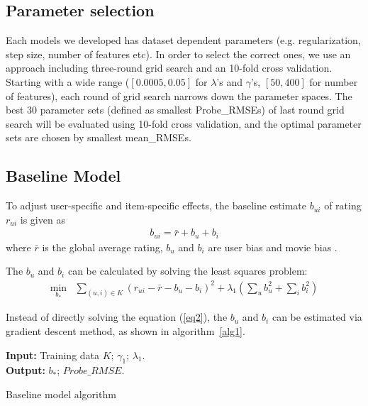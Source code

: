 \documentclass[journal]{IEEEtran}
\begin{document}
\subsection{Parameter selection}
Each models we developed has dataset dependent parameters (e.g. regularization, step size, number of features etc). In order to select the correct ones, we use an approach including three-round grid search and an 10-fold cross validation.  Starting with a wide range ($[0.0005, 0.05]$ for $\lambda$'s and $\gamma$'s, $[50,400]$ for number of features), each round of grid search narrows down the parameter spaces. The best 30 parameter sets (defined as smallest Probe\_RMSEs) of last round grid search will be evaluated using 10-fold cross validation, and the optimal parameter sets are chosen by smallest mean\_RMSEs.

\subsection{Baseline Model}
To adjust user-specific and item-specific effects, the baseline estimate $b_{ui}$ of rating $r_{ui}$ is given as
\begin{align}
\label{eq1}
{b}_{ui} = \bar{r} + b_u + b_i
\end{align}
where $\bar{r}$ is the global average rating, $b_u$ and $b_i$ are user bias and movie bias \cite{koren}.

The  $b_u$ and $b_i$ can be calculated by solving the least squares problem:
\begin{align}
\label{eq2}
\min_{b_*}  & \sum_{(u,i) \in K} ( r_{ui} - \bar{r} - b_u - b_i )^2  + \lambda_1 (\sum_u b_u^2 + \sum_i b_i^2)
\end{align}
 
Instead of directly solving the equation (\ref{eq2}), the $b_u$ and $b_i$ can be estimated via gradient descent method, as shown in algorithm~\ref{alg1}. 

\begin{algorithm}[ht]
 \SetAlgoLined  %
 \textbf{Input:} {Training data $K$; $\gamma_1$; $\lambda_1$.} \\
 \textbf{Output:} {$b_*$; $Probe\_RMSE$.} \\

 \caption{Baseline model algorithm}
\label{alg1}
\end{algorithm}
\end{document}
